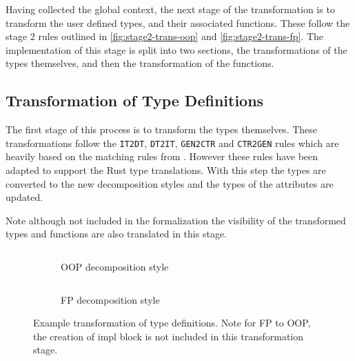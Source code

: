 \documentclass[ oneside,%
                    author={James Elgar},
                    degree={MEng},
                     title={Bidirectional transformer between functional and \\ object-oriented programming in Rust},
                  subtitle={}]{dissertation}
\newcommand{\codefile}[2]{\inputminted[xleftmargin=20pt,linenos, breaklines]{#1}{#2}}
\newcommand{\rustsnippet}[1]{\codefile{rust}{snippets/#1.rs}}
\begin{document}
Having collected the global context, the next stage of the transformation is to transform the user defined types, and their associated functions. These follow the stage 2 rules outlined in \autoref{fig:stage2-trans-oop} and \autoref{fig:stage2-trans-fp}. The implementation of this stage is split into two sections, the transformations of the types themselves, and then the transformation of the functions.

\subsection{Transformation of Type Definitions}
The first stage of this process is to transform the types themselves.  These transformations follow the \verb|IT2DT|, \verb|DT2IT|, \verb|GEN2CTR| and \verb|CTR2GEN| rules which are heavily based on the matching rules from \cite{food}. However these rules have been adapted to support the Rust type translations. With this step the types are converted to the new decomposition styles and the types of the attributes are updated.


Note although not included in the formalization the visibility of the transformed types and functions are also translated in this stage. 

\begin{figure}
\centering
\begin{subfigure}{.5\textwidth}
    \rustsnippet{type_def_transfom_oop}
    \caption{OOP decomposition style}
    \label{fig:dec-ex-oop}
\end{subfigure}%
\begin{subfigure}{.5\textwidth}
    \rustsnippet{type_def_transfom_fp}
    \caption{FP decomposition style}
    \label{fig:dec-ex-fp}
\end{subfigure}
\caption{Example transformation of type definitions. Note for FP to OOP, the creation of impl block is not included in this transformation stage.}
\label{fig:trans-type-stage}
\end{figure}
\end{document}
